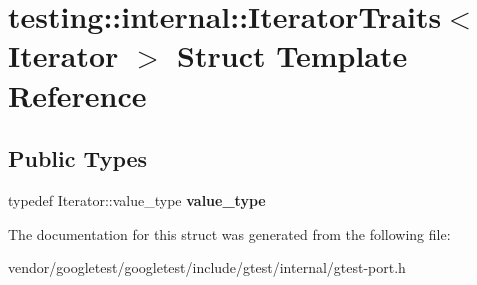\hypertarget{structtesting_1_1internal_1_1IteratorTraits}{}\section{testing\+:\+:internal\+:\+:Iterator\+Traits$<$ Iterator $>$ Struct Template Reference}
\label{structtesting_1_1internal_1_1IteratorTraits}
\subsection*{Public Types}
\begin{DoxyCompactItemize}
\item 
typedef Iterator\+::value\+\_\+type {\bfseries value\+\_\+type}\hypertarget{structtesting_1_1internal_1_1IteratorTraits_a29de4320a9c53ce438d3561b94e515bb}{}\label{structtesting_1_1internal_1_1IteratorTraits_a29de4320a9c53ce438d3561b94e515bb}

\end{DoxyCompactItemize}


The documentation for this struct was generated from the following file\+:\begin{DoxyCompactItemize}
\item 
vendor/googletest/googletest/include/gtest/internal/gtest-\/port.\+h\end{DoxyCompactItemize}
